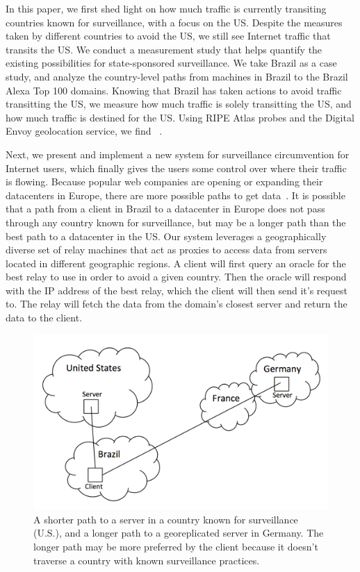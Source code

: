 In this paper, we first shed light on how much traffic is currently transiting countries known for surveillance, with a focus on the US.  Despite the measures taken by different countries to avoid the US, we still see Internet traffic that transits the US.  We conduct a measurement study that helps quantify the existing possibilities for state-sponsored surveillance.  We take Brazil as a case study, and analyze the country-level paths from machines in Brazil to the Brazil Alexa Top 100 domains.  Knowing that Brazil has taken actions to avoid traffic transitting the US, we measure how much traffic is solely transitting the US, and how much traffic is destined for the US.  Using RIPE Atlas probes and the Digital Envoy geolocation service, we find ~\cite{ripe_atlas, digital_envoy}.  

 Next, we present and implement a new system for surveillance circumvention for Internet users, which finally gives the users some control over where their traffic is flowing.  Because popular web companies are opening or expanding their datacenters in Europe, there are more possible paths to get data~\cite{eu_datacenters}.  It is possible that a path from a client in Brazil to a datacenter in Europe does not pass through any country known for surveillance, but may be a longer path than the best path to a datacenter in the US.  Our system leverages a geographically diverse set of relay machines that act as proxies to access data from servers located in different geographic regions.  A client will first query an oracle for the best relay to use in order to avoid a given country.  Then the oracle will respond with the IP address of the best relay, which the client will then send it's request to.  The relay will fetch the data from the domain's closest server and return the data to the client. 

\begin{figure}
\centering
\includegraphics[width=.5\textwidth]{intro_fig}
\caption{A shorter path to a server in a country known for surveillance (U.S.), and a longer path to a georeplicated server in Germany.  The longer path may be more preferred by the client because it doesn't traverse a country with known surveillance practices.}
\label{fig:intro}
\end{figure}

